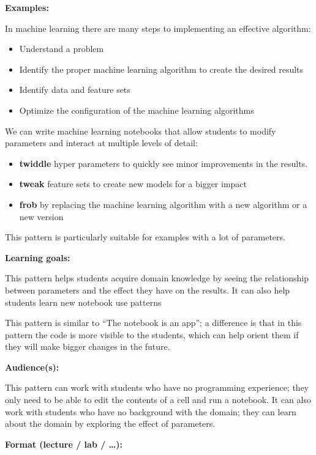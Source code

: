 \documentclass[]{book}
\providecommand{\tightlist}{%
  \setlength{\itemsep}{0pt}\setlength{\parskip}{0pt}}
\begin{document}
\textbf{Examples:}

In machine learning there are many steps to implementing an effective
algorithm:

\begin{itemize}
\tightlist
\item
  Understand a problem
\item
  Identify the proper machine learning algorithm to create the desired
  results
\item
  Identify data and feature sets
\item
  Optimize the configuration of the machine learning algorithms
\end{itemize}

We can write machine learning notebooks that allow students to modify
parameters and interact at multiple levels of detail:

\begin{itemize}
\tightlist
\item
  \textbf{twiddle} hyper parameters to quickly see minor improvements in
  the results.
\item
  \textbf{tweak} feature sets to create new models for a bigger impact
\item
  \textbf{frob} by replacing the machine learning algorithm with a new
  algorithm or a new version
\end{itemize}

This pattern is particularly suitable for examples with a lot of
parameters.

\textbf{Learning goals:}

This pattern helps students acquire domain knowledge by seeing the
relationship between parameters and the effect they have on the results.
It can also help students learn new notebook use patterns

This pattern is similar to ``The notebook is an app''; a difference is
that in this pattern the code is more visible to the students, which can
help orient them if they will make bigger changes in the future.

\textbf{Audience(s):}

This pattern can work with students who have no programming experience;
they only need to be able to edit the contents of a cell and run a
notebook. It can also work with students who have no background with the
domain; they can learn about the domain by exploring the effect of
parameters.

\textbf{Format (lecture / lab / \ldots{}):}
\end{document}
